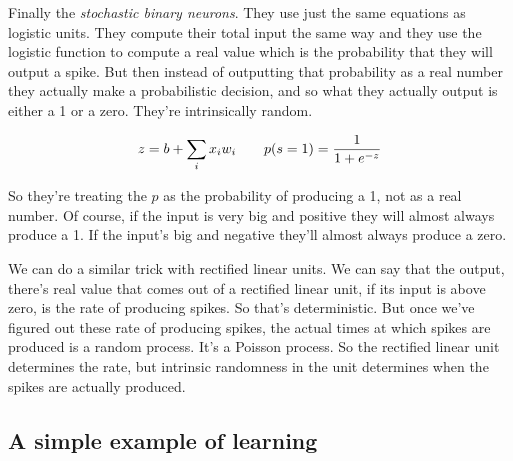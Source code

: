 \begin{multicols}{2}
\begin{footnotesize}
Finally the \emph{stochastic binary neurons}. They use just the same equations as logistic units. They compute their total input the same way and they use the logistic function to compute a real value which is the probability that they will output a spike. But then instead of outputting that probability as a real number they actually make a probabilistic decision, and so what they actually output is either a 1 or a zero. They're intrinsically random.

\begin{equation}
z = b + \sum_i x_i w_i
\qquad
p(s=1) = {1 \over 1+e^{-z}}
\label{eq:stochastic-binary-neuron}
\end{equation}

So they're treating the $p$ as the probability of producing a 1, not as a real number. Of course, if the input is very big and positive they will almost always produce a 1. If the input's big and negative they'll almost always produce a zero.

We can do a similar trick with rectified linear units. We can say that the output, there's real value that comes out of a rectified linear unit, if its input is above zero, is the rate of producing spikes. So that's deterministic. But once we've figured out these rate of producing spikes, the actual times at which spikes are produced is a random process. It's a Poisson process. So the rectified linear unit determines the rate, but intrinsic randomness in the unit determines when the spikes are actually produced.
\end{footnotesize}
\end{multicols}


\subsection{A simple example of learning}

